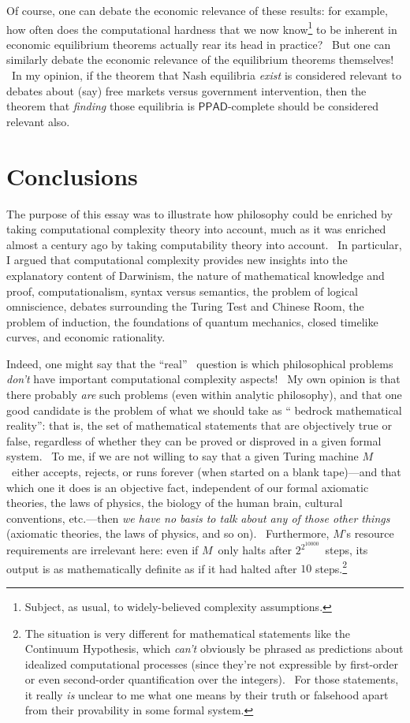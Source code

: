 \documentclass[11pt,onecolumn]{article}%
\begin{document}
Of course, one can debate the economic relevance of these results: for
example, how often does the computational hardness that we now
know\footnote{Subject, as usual, to widely-believed complexity assumptions.}
to be inherent in economic equilibrium theorems actually rear its head in
practice? \ But one can similarly debate the economic relevance of the
equilibrium theorems themselves! \ In my opinion, if the theorem that Nash
equilibria \textit{exist} is considered relevant to debates about (say) free
markets versus government intervention, then the theorem that \textit{finding}
those equilibria is $\mathsf{PPAD}$-complete should be considered relevant also.

\section{Conclusions\label{CONC}}

The purpose of this essay was to illustrate how philosophy could be enriched
by taking computational complexity theory into account, much as it was
enriched almost a century ago by taking computability theory into account.
\ In particular, I argued that computational complexity provides new insights
into the explanatory content of Darwinism, the nature of mathematical
knowledge and proof, computationalism, syntax versus semantics, the problem of
logical omniscience, debates surrounding the Turing Test and Chinese Room, the
problem of induction, the foundations of quantum mechanics, closed timelike
curves, and economic rationality.

Indeed, one might say that the \textquotedblleft real\textquotedblright%
\ question is which philosophical problems \textit{don't} have important
computational complexity aspects! \ My own opinion is that there probably
\textit{are} such problems (even within analytic philosophy), and that one
good candidate is the problem of what we should take as \textquotedblleft
bedrock mathematical reality\textquotedblright: that is, the set of
mathematical statements that are objectively true or false, regardless of
whether they can be proved or disproved in a given formal system. \ To me, if
we are not willing to say that a given Turing machine $M$\ either accepts,
rejects, or runs forever (when started on a blank tape)---and that which one
it does is an objective fact, independent of our formal axiomatic theories,
the laws of physics, the biology of the human brain, cultural conventions,
etc.---then \textit{we have no basis to talk about any of those other things}
(axiomatic theories, the laws of physics, and so on). \ Furthermore, $M$'s
resource requirements are irrelevant here: even if $M$\ only halts after
$2^{2^{10000}}$\ steps, its output is as mathematically definite as if it had
halted after $10$ steps.\footnote{The situation is very different for
mathematical statements like the Continuum Hypothesis, which \textit{can't}
obviously be phrased as predictions about idealized computational processes
(since they're not expressible by first-order or even second-order
quantification over the integers). \ For those statements, it really
\textit{is} unclear to me what one means by their truth or falsehood apart
from their provability in some formal system.}
\end{document}
